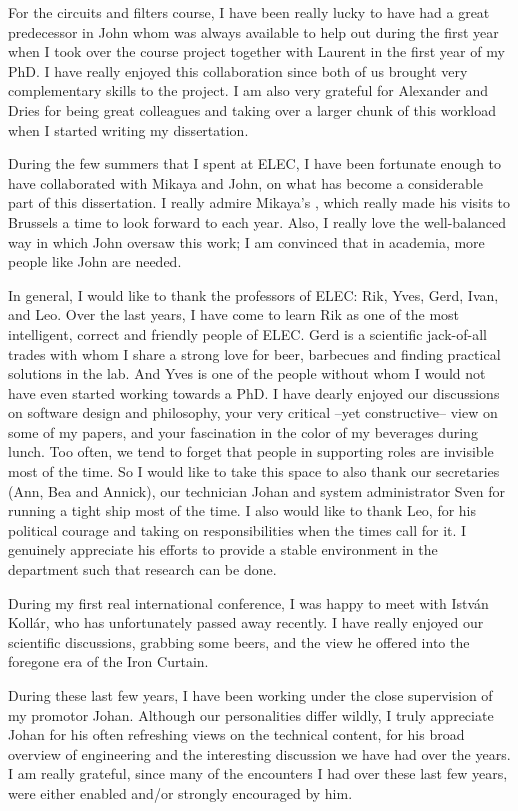 {For the circuits and filters course, I have been really lucky to have had a great predecessor in John whom was always available to help out during the first year when I took over the course project together with Laurent in the first year of my PhD.
I have really enjoyed this collaboration since both of us brought very complementary skills to the project.
I am also very grateful for Alexander and Dries for being great colleagues and taking over a larger chunk of this workload when I started writing my dissertation.

During the few summers that I spent at ELEC, I have been fortunate enough to have collaborated with Mikaya and John, on what has become a considerable part of this dissertation.
I really admire Mikaya's , which really made his visits to Brussels a time to look forward to each year.
Also, I really love the well-balanced way in which John oversaw this work; I am convinced that in academia, more people like John are needed.

In general, I would like to thank the professors of ELEC: Rik, Yves, Gerd, Ivan, and Leo.
Over the last years, I have come to learn Rik as one of the most intelligent, correct and friendly people of ELEC.
Gerd is a scientific jack-of-all trades with whom I share a strong love for beer, barbecues and finding practical solutions in the lab.
And Yves is one of the people without whom I would not have even started working towards a PhD.
I have dearly enjoyed our discussions on software design and philosophy, your very critical --yet constructive-- view on some of my papers, and your fascination in the color of my beverages during lunch.
Too often, we tend to forget that people in supporting roles are invisible most of the time.
So I would like to take this space to also thank our secretaries (Ann, Bea and Annick), our technician Johan and system administrator Sven for running a tight ship most of the time.
I also would like to thank Leo, for his political courage and taking on responsibilities when the times call for it.
I genuinely appreciate his efforts to provide a stable environment in the department such that research can be done.

During my first real international conference, I was happy to meet with István Kollár, who has unfortunately passed away recently. 
I have really enjoyed our scientific discussions, grabbing some beers, and the view he offered into the foregone era of the Iron Curtain.

During these last few years, I have been working under the close supervision of my promotor Johan.
Although our personalities differ wildly, I truly appreciate Johan for his often refreshing views on the technical content, for his broad overview of engineering and the interesting discussion we have had over the years.
I am really grateful, since many of the encounters I had over these last few years, were either enabled and/or strongly encouraged by him.

}
